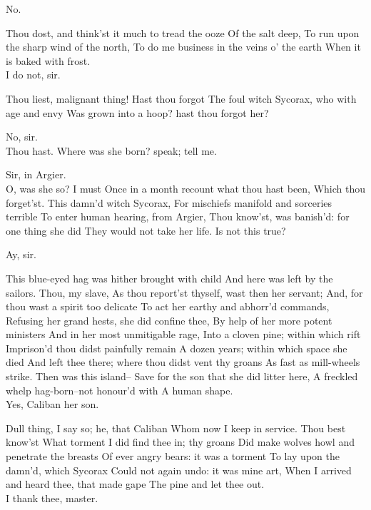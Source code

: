 \documentclass[11pt]{book}
\begin{document}
\4	No.

\1	Thou dost, and think'st it much to tread the ooze
	Of the salt deep,
	To run upon the sharp wind of the north,
	To do me business in the veins o' the earth
	When it is baked with frost. \\

\4	I do not, sir.

\1	Thou liest, malignant thing! Hast thou forgot
	The foul witch Sycorax, who with age and envy
	Was grown into a hoop? hast thou forgot her?

\4	No, sir. \\

\1	Thou hast. Where was she born? speak; tell me.

\4	Sir, in Argier. \\

\1	                  O, was she so? I must
	Once in a month recount what thou hast been,
	Which thou forget'st. This damn'd witch Sycorax,
	For mischiefs manifold and sorceries terrible
	To enter human hearing, from Argier,
	Thou know'st, was banish'd: for one thing she did
	They would not take her life. Is not this true? 

\4	Ay, sir.

\1	This blue-eyed hag was hither brought with child
	And here was left by the sailors. Thou, my slave,
	As thou report'st thyself, wast then her servant;
	And, for thou wast a spirit too delicate
	To act her earthy and abhorr'd commands,
	Refusing her grand hests, she did confine thee,
	By help of her more potent ministers
	And in her most unmitigable rage,
	Into a cloven pine; within which rift
	Imprison'd thou didst painfully remain
	A dozen years; within which space she died
	And left thee there; where thou didst vent thy groans
	As fast as mill-wheels strike. Then was this island--
	Save for the son that she did litter here,
	A freckled whelp hag-born--not honour'd with
	A human shape. \\

\4	                  Yes, Caliban her son.

\1	Dull thing, I say so; he, that Caliban
	Whom now I keep in service. Thou best know'st
	What torment I did find thee in; thy groans
	Did make wolves howl and penetrate the breasts
	Of ever angry bears: it was a torment
	To lay upon the damn'd, which Sycorax
	Could not again undo: it was mine art,
	When I arrived and heard thee, that made gape
	The pine and let thee out. \\

\4	I thank thee, master.
\end{document}
